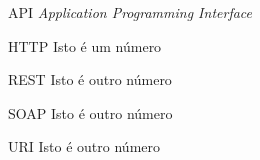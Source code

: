 \begin{siglas}
  \item[API] \textit{Application Programming Interface}
  \item[HTTP] Isto é um número
  \item[REST] Isto é outro número
  \item[SOAP] Isto é outro número
  \item[URI] Isto é outro número
\end{siglas}
